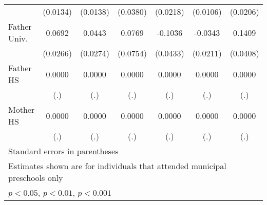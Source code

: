 \begin{table}[htbp]
\begin{tabular}{l*{6}{c}}
            &    (0.0134)         &    (0.0138)         &    (0.0380)         &    (0.0218)         &    (0.0106)         &    (0.0206)         \\
\addlinespace
Father Univ.&      0.0692\sym{**} &      0.0443         &      0.0769         &     -0.1036\sym{*}  &     -0.0343         &      0.1409\sym{***}\\
            &    (0.0266)         &    (0.0274)         &    (0.0754)         &    (0.0433)         &    (0.0211)         &    (0.0408)         \\
\addlinespace
Father HS   &      0.0000         &      0.0000         &      0.0000         &      0.0000         &      0.0000         &      0.0000         \\
            &         (.)         &         (.)         &         (.)         &         (.)         &         (.)         &         (.)         \\
\addlinespace
Mother HS   &      0.0000         &      0.0000         &      0.0000         &      0.0000         &      0.0000         &      0.0000         \\
            &         (.)         &         (.)         &         (.)         &         (.)         &         (.)         &         (.)         \\
\bottomrule
\multicolumn{7}{l}{\footnotesize Standard errors in parentheses}\\
\multicolumn{7}{l}{\footnotesize Estimates shown are for individuals that attended municipal preschools only}\\
\multicolumn{7}{l}{\footnotesize \sym{*} \(p<0.05\), \sym{**} \(p<0.01\), \sym{***} \(p<0.001\)}\\
\end{tabular}
\end{table}
